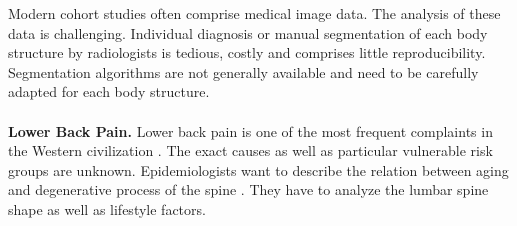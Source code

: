 \documentclass[a4paper,twoside]{style/article}
\begin{document}
Modern cohort studies often comprise medical image data.
The analysis of these data is challenging.
Individual diagnosis or manual segmentation of each body structure by radiologists is tedious, costly and comprises little reproducibility.
Segmentation algorithms are not generally available and need to be carefully adapted for each body structure.
\\\\
\noindent \textbf{Lower Back Pain.}
Lower back pain is one of the most frequent complaints in the Western civilization \cite{Hoy2010}.
The exact causes as well as particular vulnerable risk groups are unknown.
Epidemiologists want to describe the relation between aging and degenerative process of the spine \cite{Szpalski2005}.
They have to analyze the lumbar spine shape as well as lifestyle factors.
\end{document}
